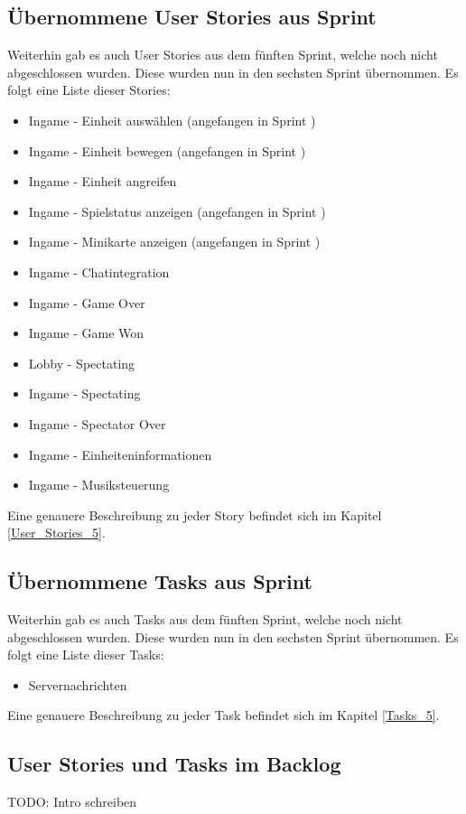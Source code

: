 \documentclass[12pt, titlepage]{scrartcl}
\newcommand{\RN}[1]{%
	\textup{\uppercase\expandafter{\romannumeral#1}}%
}
\begin{document}
   		\subsection{\"Ubernommene User Stories aus Sprint \RN{5}}
   			Weiterhin gab es auch User Stories aus dem f\"unften Sprint, welche noch nicht abgeschlossen wurden. Diese wurden nun in den sechsten Sprint \"ubernommen. Es folgt eine Liste dieser Stories:
   			\begin{itemize}
   				\item Ingame - Einheit ausw\"ahlen (angefangen in Sprint \RN{5})
   				\item Ingame - Einheit bewegen (angefangen in Sprint \RN{5})
   				\item Ingame - Einheit angreifen
   				\item Ingame - Spielstatus anzeigen (angefangen in Sprint \RN{5})
   				\item Ingame - Minikarte anzeigen (angefangen in Sprint \RN{5})
   				\item Ingame - Chatintegration
   				\item Ingame - Game Over
   				\item Ingame - Game Won
   				\item Lobby - Spectating
   				\item Ingame - Spectating
   				\item Ingame - Spectator Over
   				\item Ingame - Einheiteninformationen
   				\item Ingame - Musiksteuerung
   			\end{itemize}
   			Eine genauere Beschreibung zu jeder Story befindet sich im Kapitel \ref{User_Stories_5}.
    	\subsection{\"Ubernommene Tasks aus Sprint \RN{5}}
    		Weiterhin gab es auch Tasks aus dem f\"unften Sprint, welche noch nicht abgeschlossen wurden. Diese wurden nun in den sechsten Sprint \"ubernommen. Es folgt eine Liste dieser Tasks:
	    	\begin{itemize}
	    		\item Servernachrichten
	    	\end{itemize}
    		Eine genauere Beschreibung zu jeder Task befindet sich im Kapitel \ref{Tasks_5}.
    	\subsection{User Stories und Tasks im Backlog} \label{Backlog_6}
    		TODO: Intro schreiben
\end{document}
